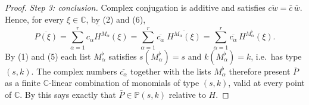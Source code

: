 \begin{proof}
\emph{Step 3: conclusion.}  Complex conjugation is additive and satisfies
$\overline{cw}=\bar c\,\bar w$.  Hence, for every $\xi\in\mathbb{C}$, by (2)
and (6),
\[
  \overline{P(\xi)}
  =\overline{\sum_{\alpha=1}^{r}c_\alpha H^{M_\alpha}(\xi)}
  =\sum_{\alpha=1}^{r}\overline{c_\alpha}\;\overline{H^{M_\alpha}(\xi)}
  =\sum_{\alpha=1}^{r}\overline{c_\alpha}\,H^{M_\alpha^{\flat}}(\xi).
\]
By (1) and (5) each list $M_\alpha^{\flat}$ satisfies
$s(M_\alpha^{\flat})=s$ and $k(M_\alpha^{\flat})=k$, i.e.\ has type $(s,k)$.
The complex numbers $\overline{c_\alpha}$ together with the lists
$M_\alpha^{\flat}$ therefore present $\bar P$ as a finite
$\mathbb{C}$-linear combination of monomials of type $(s,k)$, valid at every
point of $\mathbb{C}$.  By  this says exactly that
$\bar P\in\mathbb{P}(s,k)$ relative to $H$.
\end{proof}
